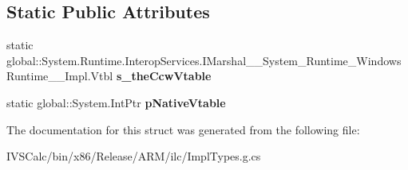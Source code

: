 \subsection*{Static Public Attributes}
\begin{DoxyCompactItemize}
\item 
\mbox{\label{struct_system_1_1_runtime_1_1_interop_services_1_1_i_marshal_____system___runtime___windows_runtime_____impl_1_1_vtbl_a211896b94448f7285a06dc2404f0d32f}} 
static global\+::\+System.\+Runtime.\+Interop\+Services.\+I\+Marshal\+\_\+\+\_\+\+System\+\_\+\+Runtime\+\_\+\+Windows\+Runtime\+\_\+\+\_\+\+Impl.\+Vtbl {\bfseries s\+\_\+the\+Ccw\+Vtable}
\item 
\mbox{\label{struct_system_1_1_runtime_1_1_interop_services_1_1_i_marshal_____system___runtime___windows_runtime_____impl_1_1_vtbl_a1922c166e101dd85c44a7e1bb964c68d}} 
static global\+::\+System.\+Int\+Ptr {\bfseries p\+Native\+Vtable}
\end{DoxyCompactItemize}


The documentation for this struct was generated from the following file\+:\begin{DoxyCompactItemize}
\item 
I\+V\+S\+Calc/bin/x86/\+Release/\+A\+R\+M/ilc/Impl\+Types.\+g.\+cs\end{DoxyCompactItemize}
